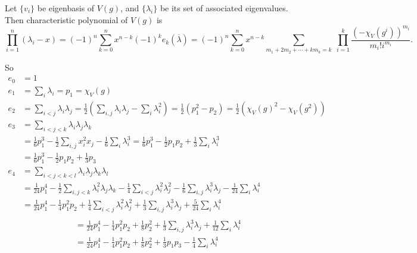 \documentclass[12pt,a4paper]{article}
\begin{document}
    \begin{problem}{3}
        Let $\{v_i\}$ be eigenbasis of $V(g)$, and $\{\lambda_i\}$ be its set of associated eigenvalues. Then characteristic polynomial of $V(g)$ is
        \[
            \prod_{i=1}^n (\lambda_i - x)
            = (-1)^n \sum_{k=0}^n x^{n-k} (-1)^k e_k(\overline{\lambda})
            = (-1)^n \sum_{k=0}^n x^{n-k} \sum_{m_1 + 2 m_2 + \cdots + k m_k = k} \; \prod_{i=1}^k \frac{(-\chi_V(g^i))^{m_i}}{m_i! i^{m_i}}.
        \]

        So
        \begin{align*}
            e_0 &= 1\\
            e_1 &= \sum_i \lambda_i = p_1 = \chi_V(g)\\
            e_2 &= \sum_{i < j} \lambda_i \lambda_j = \frac{1}{2} \left(\sum_{i, j} \lambda_i \lambda_j - \sum_{i} \lambda_i^2\right) = \frac{1}{2} (p_1^2 - p_2) = \frac{1}{2} (\chi_V(g)^2 - \chi_V(g^2))\\
            e_3 &= \sum_{i < j < k} \lambda_i \lambda_j \lambda_k\\
                &= \frac{1}{6} p_1^3 - \frac{1}{2} \sum_{i, j} x_i^2 x_j - \frac{1}{6} \sum_i \lambda_i^3 = \frac{1}{6} p_1^3 - \frac{1}{2} p_1 p_2 + \frac{1}{3} \sum_i \lambda_i^3\\
                &= \frac{1}{6} p_1^3 - \frac{1}{2} p_1 p_2 + \frac{1}{3} p_3\\
            e_4 &= \sum_{i < j < k < l} \lambda_i \lambda_j \lambda_k \lambda_l\\
                &= \frac{1}{24} p_1^4 - \frac{1}{2} \sum_{i, j < k} \lambda_i^2 \lambda_j \lambda_k - \frac{1}{4} \sum_{i < j} \lambda_i^2 \lambda_j^2 - \frac{1}{6} \sum_{i, j} \lambda_i^3 \lambda_j - \frac{1}{24} \sum_{i} \lambda_i^4\\
                &= \frac{1}{24} p_1^4 - \frac{1}{4} p_1^2 p_2 + \frac{1}{4} \sum_{i < j} \lambda_i^2 \lambda_j^2 + \frac{1}{3} \sum_{i, j} \lambda_i^3 \lambda_j + \frac{5}{24} \sum_{i} \lambda_i^4\\
        \end{align*}
        \begin{align*}
            &= \frac{1}{24} p_1^4 - \frac{1}{4} p_1^2 p_2 + \frac{1}{8} p_2^2 + \frac{1}{3} \sum_{i, j} \lambda_i^3 \lambda_j + \frac{1}{12} \sum_{i} \lambda_i^4\\
            &= \frac{1}{24} p_1^4 - \frac{1}{4} p_1^2 p_2 + \frac{1}{8} p_2^2 + \frac{1}{3} p_1 p_3 - \frac{1}{4} \sum_{i} \lambda_i^4\\

\end{align*}
\end{problem}
\end{document}

